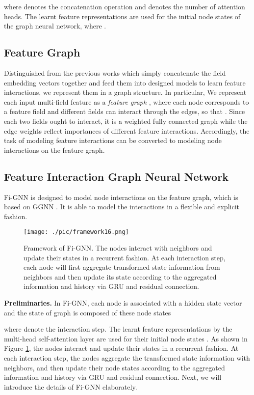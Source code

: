 \documentclass[sigconf]{acmart}
\begin{document}
where  denotes the concatenation operation and  denotes the number of attention heads.
The learnt feature representations  are used for the initial node states of the graph neural network, where .

\subsection{Feature Graph} 
Distinguished from the previous works which simply concatenate the field embedding vectors together and feed them into designed models to learn feature interactions, we represent them in a graph structure.
In particular, We represent each input multi-field feature as a \emph{feature graph} ,
where each node  corresponds to a feature field  and different fields can interact through the edges, so that . 
Since each two fields ought to interact, it is a weighted fully connected graph while the edge weights reflect importances of different feature interactions. 
Accordingly, the task of modeling feature interactions can be converted to modeling node interactions on the feature graph. 





\subsection{Feature Interaction Graph Neural Network}\label{sect:model} 
Fi-GNN is designed to model node interactions on the feature graph, which is based on GGNN \cite{li2015gated}.
It is able to model the interactions in a flexible and explicit fashion.

\begin{figure}[t]
\centering
\texttt{[image: ./pic/framework16.png]}
\caption{Framework of Fi-GNN. 
The nodes interact with neighbors and update their states in a recurrent fashion.
At each interaction step, each node will first aggregate transformed state information from neighbors and then update its state according to the aggregated information and history via GRU and residual connection.}
\label{fig:framework}
\end{figure}

\noindent \textbf{Preliminaries.}
In Fi-GNN, each node  is associated with a hidden state vector  and the state of graph is composed of these node states
\begin{center}	

\end{center}
where  denote the interaction step.
The learnt feature representations by the multi-head self-attention layer are used for their initial node states .
As shown in Figure \ref{fig:framework}, the nodes interact and update their states in a recurrent fashion. 
At each interaction step, the nodes aggregate the transformed state information with neighbors, and then update their node states according to the aggregated information and history via GRU and residual connection.
Next, we will introduce the details of Fi-GNN elaborately.
\end{document}
